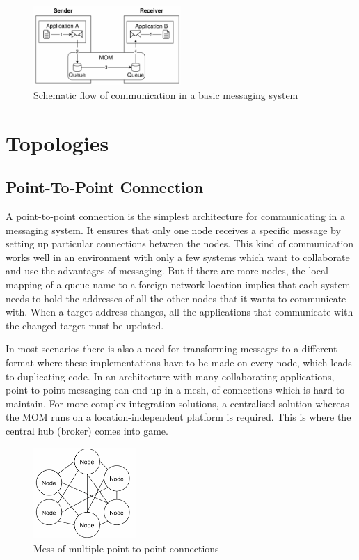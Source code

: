 \begin{figure}[H]
    \centering
    \includegraphics[width=0.5\textwidth]{images/mom-schema.png}
    \caption{Schematic flow of communication in a basic messaging system }
    \label{fig:message-oriented-middleware}
\end{figure}

\section{Topologies}
\subsection{Point-To-Point Connection}
\label{intro-messaging-pointtopoint}
A point-to-point connection is the simplest architecture for communicating in a
messaging system. It ensures that only one node receives a specific message by
setting up particular connections between the nodes. This kind of
communication works well in an environment with only a few systems which want to
collaborate and use the advantages of messaging. But if there are more
nodes, the local mapping of a queue name to a foreign network location
implies that each system needs to hold the addresses of all the other nodes that it
wants to communicate with. When a target address changes, all the applications that
communicate with the changed target must be updated. 

In most scenarios there is also a need for transforming messages to a different
format where these implementations have to be made on every node, which leads to
duplicating code. In an architecture with many collaborating applications,
point-to-point messaging can end up in a mesh, of connections which is hard to
maintain.  For more complex integration solutions, a centralised solution
whereas the MOM runs on a location-independent platform is required. This is
where the central hub (broker) comes into game. \cite{MSDNIntegration}

\begin{figure}[H]
    \centering
    \includegraphics[width=0.35\textwidth]{images/point-to-point-messaging.png}
    \caption{Mess of multiple point-to-point connections}
    \label{fig:point-to-point-messaging}
\end{figure}

